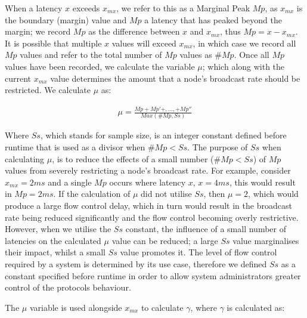        
    When a latency $x$ exceeds $x_{mx}$, we refer to this as a Marginal Peak $Mp$, as $x_{mx}$ is the boundary (margin) value and $Mp$ a latency that has peaked beyond the margin; we record $Mp$ as the difference between $x$ and $x_{mx}$, thus $Mp = x - x_{mx}$.  It is possible that multiple $x$ values will exceed $x_{mx}$, in which case we record all $Mp$ values and refer to the total number of $Mp$ values as $\#Mp$.   Once all $Mp$ values have been recorded, we calculate the variable $\mu$; which along with the current $x_{mx}$ value determines the amount that a node's broadcast rate should be restricted.  We calculate $\mu$ as:
    
    \begin{equation*}
		     \begin{aligned}
		         \mu = \frac{Mp + Mp'+,\ldots,+ Mp''}{Max(\#Mp, Ss)}
		     \end{aligned}
    \end{equation*} 
    
    Where $Ss$, which stands for sample size, is an integer constant defined before runtime that is used as a divisor when $\#Mp < Ss$.  The purpose of $Ss$ when calculating $\mu$, is to reduce the effects of a small number ($\#Mp < Ss$) of $Mp$ values from severely restricting a node's broadcast rate.  For example, consider  $x_{mx} = 2ms$ and a single $Mp$ occurs where latency $x$, $x = 4ms$, this would result in $Mp = 2ms$.  If the calculation of $\mu$ did not utilise $Ss$, then $\mu = 2$, which would produce a large flow control delay, which in turn would result in the broadcast rate being reduced significantly and the flow control becoming overly restrictive.  However, when we utilise the $Ss$ constant, the influence of a small number of latencies on the calculated $\mu$ value can be reduced; a large $Ss$ value marginalises their impact, whilst a small $Ss$ value promotes it.  The level of flow control required by a system is determined by its use case, therefore we defined $Ss$ as a constant specified before runtime in order to allow system administrators greater control of the protocols behaviour.  
    
    The $\mu$ variable is used alongside $x_{mx}$ to calculate $\gamma$, where $\gamma$ is calculated as:
    
